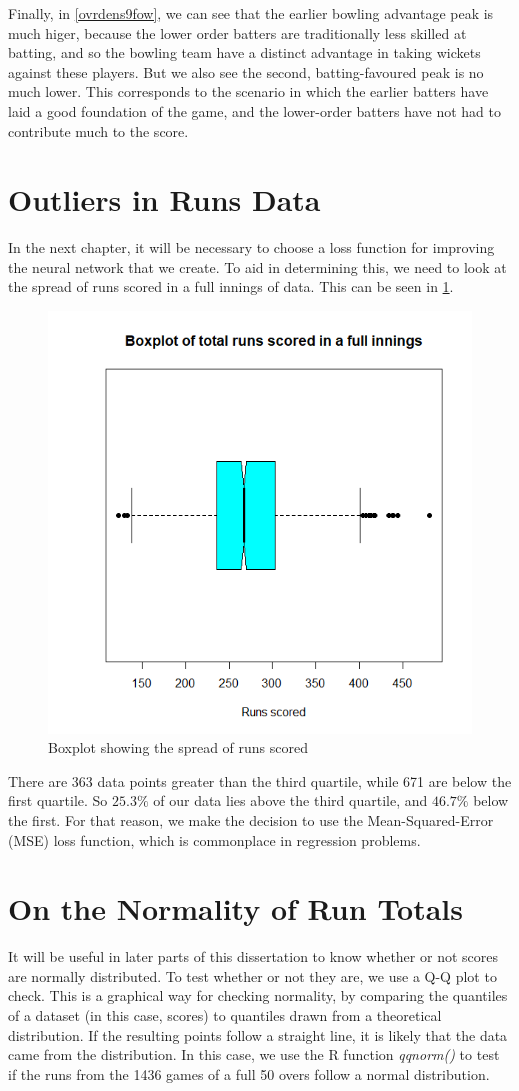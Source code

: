 Finally, in \ref{ovrdens9fow}, we can see that the earlier bowling advantage peak is much higer, because the lower order batters are traditionally less skilled 
at batting, and so the bowling team have a distinct advantage in taking wickets against these players. But we also see the second, batting-favoured peak is no much lower.
This corresponds to the scenario in which the earlier batters have laid a good foundation of the game, and the lower-order batters have not had to contribute much to the score.

\section{Outliers in Runs Data}
\label{mse}
In the next chapter, it will be necessary to choose a loss function for improving the neural network that we create. To aid in determining this, we need to look at the
spread of runs scored in a full innings of data. This can be seen in \ref{runsbox}.

\begin{figure}[h]
    \centering
    \includegraphics[width=0.4\linewidth]{figures/runsbox.png}
    \caption{Boxplot showing the spread of runs scored}
    \label{runsbox}
\end{figure}

There are 363 data points greater than the third quartile, while 671 are below the first quartile. So $25.3\%$ of our data lies above the third quartile, and
$46.7\%$ below the first. For that reason, we make the decision to use the Mean-Squared-Error (MSE) loss function, which is commonplace in regression problems.

\section{On the Normality of Run Totals}
It will be useful in later parts of this dissertation to know whether or not scores are normally distributed. To test whether or not 
they are, we use a Q-Q plot to check. This is a graphical way for checking normality, by comparing the quantiles of a dataset (in this case, scores) to quantiles
drawn from a theoretical distribution. If the resulting points follow a straight line, it is likely that the data came from the distribution.
In this case, we use the R function \textit{qqnorm()} to test if the runs from the 1436 games of a full 50 overs follow a normal distribution.

